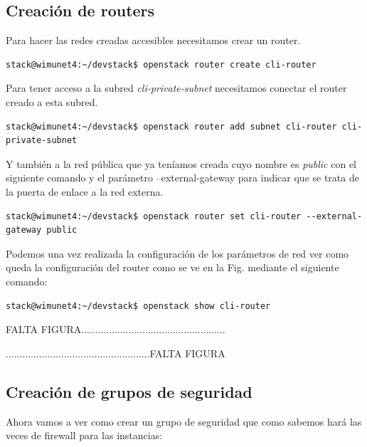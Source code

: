 \subsection{Creación de routers}
Para hacer las redes creadas accesibles necesitamos crear un router.

\begin{lstlisting}[style=Consola]
stack@wimunet4:~/devstack$ openstack router create cli-router
\end{lstlisting}

Para tener acceso a la subred \textit{cli-private-subnet} necesitamos conectar el router creado a esta subred.

\begin{lstlisting}[style=Consola]
stack@wimunet4:~/devstack$ openstack router add subnet cli-router cli-private-subnet
\end{lstlisting}

Y también a la red pública que ya teníamos creada cuyo nombre es \textit{public} con el siguiente comando y el parámetro --external-gateway para indicar que se trata de la puerta de enlace a la red externa.

\begin{lstlisting}[style=Consola]
stack@wimunet4:~/devstack$ openstack router set cli-router --external-gateway public
\end{lstlisting}

Podemos una vez realizada la configuración de los parámetros de red ver como queda la configuración del router como se ve en la Fig. mediante el siguiente comando:

\begin{lstlisting}[style=Consola]
stack@wimunet4:~/devstack$ openstack show cli-router
\end{lstlisting}

\begin{tcolorbox}[colback=green!5!white,colframe=green!75!black]
FALTA FIGURA....................................................

....................................................FALTA FIGURA
\end{tcolorbox}

\subsection{Creación de grupos de seguridad}
Ahora vamos a ver como crear un grupo de seguridad que como sabemos hará las veces de firewall para las instancias:

